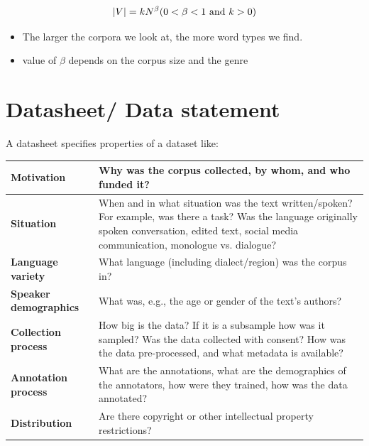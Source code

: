 \[
    |V| = kN^{\beta} \hfill (0 < \beta < 1 \text{ and } k > 0)
\]

\begin{itemize}
    \item The larger the corpora we look at, the more word types we find.
    \item value of $\beta$ depends on the corpus size and the genre
\end{itemize}

\section{Datasheet/ Data statement}\label{Datasheet/ Data statement}

A datasheet specifies properties of a dataset like:
\begin{table}[h]
    \centering
    \begin{tabular}{|m{3.5cm}|m{11.5cm}|}
        \hline
        
        \textbf{Motivation} & Why was the corpus collected, by whom, and who funded it?  \\ 
        \hline
         
         \textbf{Situation} & When and in what situation was the text written/spoken? For example, was there a task? Was the language originally spoken conversation, edited text, social media communication, monologue vs. dialogue? \\
         \hline
         
        \textbf{Language variety} & What language (including dialect/region) was the corpus in? \\
        \hline
        
        \textbf{Speaker demographics} & What was, e.g., the age or gender of the text’s authors? \\
        \hline
        
        \textbf{Collection process} & How big is the data? If it is a subsample how was it sampled? Was the data collected with consent? How was the data pre-processed, and what metadata is available? \\
        \hline

        \textbf{Annotation process} & What are the annotations, what are the demographics of the annotators, how were they trained, how was the data annotated? \\ 
        \hline

        \textbf{Distribution} & Are there copyright or other intellectual property restrictions?\\
        \hline
        
    \end{tabular}
\end{table}


